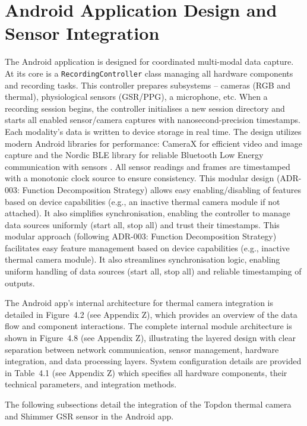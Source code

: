 \section{Android Application Design and Sensor Integration}\label{sec:4-2}
The Android application is designed for coordinated multi-modal data capture. At its core is a \texttt{RecordingController} class managing all hardware components and recording tasks. This controller prepares subsystems -- cameras (RGB and thermal), physiological sensors (GSR/PPG), a microphone, etc. When a recording session begins, the controller initialises a new session directory and starts all enabled sensor/camera captures with nanosecond-precision timestamps. Each modality's data is written to device storage in real time. The design utilizes modern Android libraries for performance: CameraX for efficient video and image capture \cite{ref13} and the Nordic BLE library for reliable Bluetooth Low Energy communication with sensors \cite{ref14}. All sensor readings and frames are timestamped with a monotonic clock source to ensure consistency. This modular design (ADR-003: Function Decomposition Strategy) allows easy enabling/disabling of features based on device capabilities (e.g., an inactive thermal camera module if not attached). It also simplifies synchronisation, enabling the controller to manage data sources uniformly (start all, stop all) and trust their timestamps. This modular approach (following ADR-003: Function Decomposition Strategy) facilitates easy feature management based on device capabilities (e.g., inactive thermal camera module). It also streamlines synchronisation logic, enabling uniform handling of data sources (start all, stop all) and reliable timestamping of outputs.

The Android app's internal architecture for thermal camera integration is detailed in Figure~4.2 (see Appendix Z), which provides an overview of the data flow and component interactions. The complete internal module architecture is shown in Figure~4.8 (see Appendix Z), illustrating the layered design with clear separation between network communication, sensor management, hardware integration, and data processing layers. System configuration details are provided in Table~4.1 (see Appendix Z) which specifies all hardware components, their technical parameters, and integration methods.

The following subsections detail the integration of the Topdon thermal camera and Shimmer GSR sensor in the Android app.


